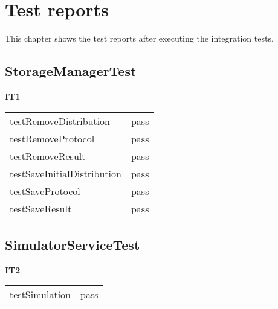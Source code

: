 \chapter{Test reports}
\label{chap:testReports}

This chapter shows the test reports after executing the integration tests.

\section{StorageManagerTest}

\textbf{IT1}

\fpstartparagraph{} \begin{tabular}{l|l}
testRemoveDistribution & pass \\
testRemoveProtocol    & pass \\
testRemoveResult        & pass \\
testSaveInitialDistribution & pass \\
testSaveProtocol    & pass \\
testSaveResult        & pass \\
\end{tabular}

\section{SimulatorServiceTest}

\textbf{IT2}

\fpstartparagraph{} \begin{tabular}{l|l}
testSimulation & pass \\
\end{tabular}